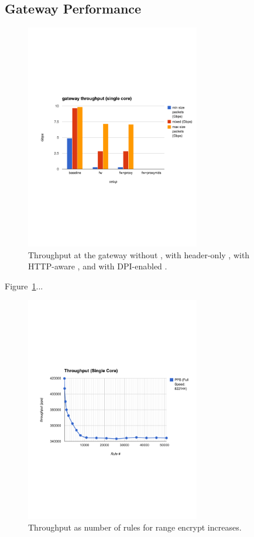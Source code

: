 \subsection{Gateway Performance}
\begin{figure}[t]
  \includegraphics[width=3in]{fig/gatewayxput}
  \caption[]{\label{fig:gwxput} Throughput at the gateway without \sys, with header-only \sys, with HTTP-aware \sys, and with DPI-enabled \sys.}
\end{figure}


Figure~\ref{fig:gwxput}...

\begin{figure}[t]
  \includegraphics[width=3in]{fig/xputrange}
  \caption[]{\label{fig:xputrange} Throughput as number of rules for range encrypt increases.}
\end{figure}


